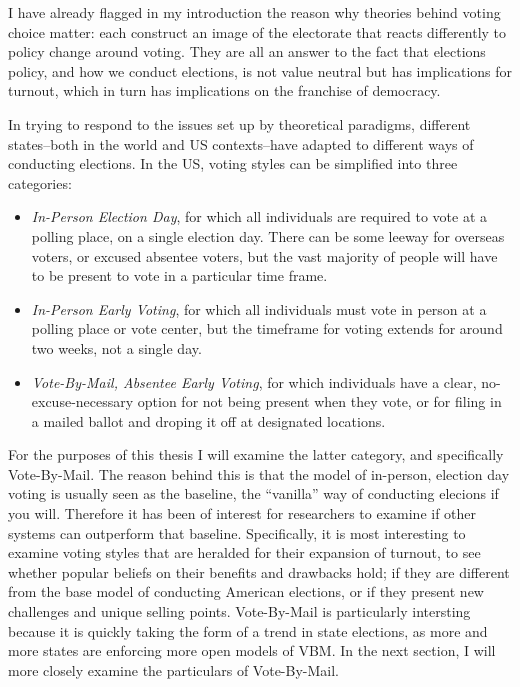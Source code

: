 \documentclass[12pt,twoside]{reedthesis}
\begin{document}
  I have already flagged in my introduction the reason why theories behind
  voting choice matter: each construct an image of the electorate that
  reacts differently to policy change around voting. They are all an
  answer to the fact that elections policy, and how we conduct elections,
  is not value neutral but has implications for turnout, which in turn has
  implications on the franchise of democracy.
  
  In trying to respond to the issues set up by theoretical paradigms,
  different states--both in the world and US contexts--have adapted to
  different ways of conducting elections. In the US, voting styles can be
  simplified into three categories:
  
  \begin{itemize}
  \item
    \emph{In-Person Election Day}, for which all individuals are required
    to vote at a polling place, on a single election day. There can be
    some leeway for overseas voters, or excused absentee voters, but the
    vast majority of people will have to be present to vote in a
    particular time frame.
  \item
    \emph{In-Person Early Voting}, for which all individuals must vote in
    person at a polling place or vote center, but the timeframe for voting
    extends for around two weeks, not a single day.
  \item
    \emph{Vote-By-Mail, Absentee Early Voting}, for which individuals have
    a clear, no-excuse-necessary option for not being present when they
    vote, or for filing in a mailed ballot and droping it off at
    designated locations.
  \end{itemize}
  
  For the purposes of this thesis I will examine the latter category, and
  specifically Vote-By-Mail. The reason behind this is that the model of
  in-person, election day voting is usually seen as the baseline, the
  ``vanilla'' way of conducting elecions if you will. Therefore it has
  been of interest for researchers to examine if other systems can
  outperform that baseline. Specifically, it is most interesting to
  examine voting styles that are heralded for their expansion of turnout,
  to see whether popular beliefs on their benefits and drawbacks hold; if
  they are different from the base model of conducting American elections,
  or if they present new challenges and unique selling points.
  Vote-By-Mail is particularly intersting because it is quickly taking the
  form of a trend in state elections, as more and more states are
  enforcing more open models of VBM. In the next section, I will more
  closely examine the particulars of Vote-By-Mail.
  
\end{document}
